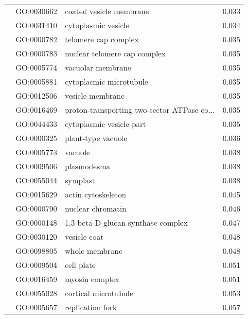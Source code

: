 \begin{longtable}{lllr}
   & GO:0030662 &                      coated vesicle membrane &         0.033 \\
   & GO:0031410 &                          cytoplasmic vesicle &         0.034 \\
   & GO:0000782 &                         telomere cap complex &         0.035 \\
   & GO:0000783 &                 nuclear telomere cap complex &         0.035 \\
   & GO:0005774 &                            vacuolar membrane &         0.035 \\
   & GO:0005881 &                      cytoplasmic microtubule &         0.035 \\
   & GO:0012506 &                             vesicle membrane &         0.035 \\
   & GO:0016469 &  proton-transporting two-sector ATPase co... &         0.035 \\
   & GO:0044433 &                     cytoplasmic vesicle part &         0.035 \\
   & GO:0000325 &                           plant-type vacuole &         0.036 \\
   & GO:0005773 &                                      vacuole &         0.038 \\
   & GO:0009506 &                                  plasmodesma &         0.038 \\
   & GO:0055044 &                                     symplast &         0.038 \\
   & GO:0015629 &                           actin cytoskeleton &         0.045 \\
   & GO:0000790 &                            nuclear chromatin &         0.046 \\
   & GO:0000148 &           1,3-beta-D-glucan synthase complex &         0.047 \\
   & GO:0030120 &                                 vesicle coat &         0.048 \\
   & GO:0098805 &                               whole membrane &         0.048 \\
   & GO:0009504 &                                   cell plate &         0.051 \\
   & GO:0016459 &                               myosin complex &         0.051 \\
   & GO:0055028 &                         cortical microtubule &         0.053 \\
   & GO:0005657 &                             replication fork &         0.057 \\

\end{longtable}
